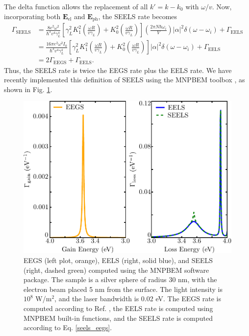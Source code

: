 \documentclass [11pt, proquest] {uwthesis}[2016/11/22]
\begin{document}
The delta function allows the replacement of all $k' = k-k_0$ with $\omega/v$. Now, incorporating both $\textbf{E}_{\textrm{el}}$ and $\textbf{E}_{\textrm{ph}}$, the SEELS rate becomes
\begin{equation}
\begin{aligned}
\Gamma_{\textrm{SEELS}} &= \frac{8e^2\omega^2}{\hbar^3v^4\gamma_{L}^4}\left[\gamma_{L}^2K_1^2\left(\frac{\omega R}{v\gamma_L}\right)+K_0^2\left(\frac{\omega R}{v\gamma_L}\right)\right]\left(\frac{2\pi N\hbar\omega_i}{V}\right)|\alpha|^2\delta(\omega-\omega_i) + \Gamma_{\textrm{EELS}}\\
& = \frac{16\pi e^2\omega^2 I_0}{\hbar^3v^4\gamma_{L}^4}\left[\gamma_{L}^2K_1^2\left(\frac{\omega R}{v\gamma_L}\right)+K_0^2\left(\frac{\omega R}{v\gamma_L}\right)\right]|\alpha|^2\delta(\omega-\omega_i) + \Gamma_{\textrm{EELS}}\\
& = 2\Gamma_{\textrm{EEGS}} + \Gamma_{\textrm{EELS}}.
\label{seels_eegs}
\end{aligned}
\end{equation}
Thus, the SEELS rate is twice the EEGS rate plus the EELS rate. We have recently implemented this definition of SEELS using the MNPBEM toolbox \cite{Hohenester2012,Hohenester2014}, as shown in Fig. \ref{seels_bem}.

\begin{figure}
\begin{centering}
\includegraphics{seels_eegs_bem.pdf}
\caption{EEGS (left plot, orange), EELS (right, solid blue), and SEELS (right, dashed green) computed using the MNPBEM software package. The sample is a silver sphere of radius 30 nm, with the electron beam placed 5 nm from the surface. The light intensity is $10^8$ W/m$^2$, and the laser bandwidth is 0.02 eV. The EEGS rate is computed according to Ref. \cite{EEGS}, the EELS rate is computed using MNPBEM built-in functions, and the SEELS rate is computed according to Eq. \ref{seels_eegs}.}
\label{seels_bem}
\end{centering}
\end{figure}
\end{document}
